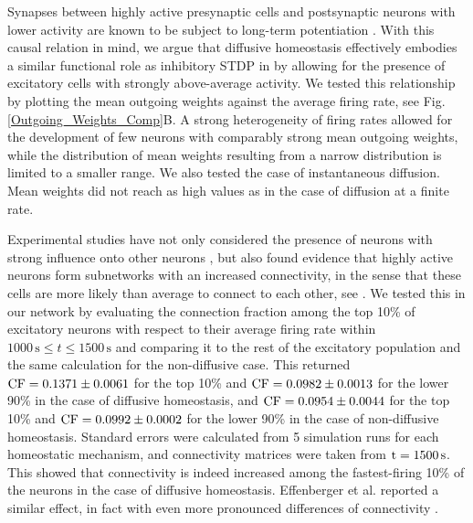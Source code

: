 \documentclass[10pt,letterpaper]{article}
\begin{document}
Synapses between highly active presynaptic cells and postsynaptic neurons with lower activity are known to be subject to long-term potentiation \cite{Sjoestroem_Syn_Plasticity_2001,Feldman_STDP_2012}. With this causal relation in mind, we argue that diffusive homeostasis effectively embodies a similar functional role as inhibitory STDP in \cite{Effenberger_2015} by allowing for the presence of excitatory cells with strongly above-average activity. We tested this relationship by plotting the mean outgoing weights against the average firing rate, see Fig. \ref{Outgoing_Weights_Comp}B. A strong heterogeneity of firing rates allowed for the development of few neurons with comparably strong mean outgoing weights, while the distribution of mean weights resulting from a narrow distribution is limited to a smaller range. We also tested the case of instantaneous diffusion. Mean weights did not reach as high values as in the case of diffusion at a finite rate.

Experimental studies have not only considered the presence of neurons with strong influence onto other neurons \cite{Eckmann_Leader_Neurons_2008}, but also found evidence that highly active neurons form subnetworks with an increased connectivity, in the sense that these cells are more likely than average to connect to each other, see \cite{Yassin_Subnetworks_2010}. We tested this in our network by evaluating the connection fraction among the top 10\% of excitatory neurons with respect to their average firing rate within $\mathrm{1000\,s} \leq t \leq \mathrm{1500\,s}$ and comparing it to the rest of the excitatory population and the same calculation for the non-diffusive case. This returned $\rm CF= 0.1371 \pm 0.0061$ for the top 10\% and $\rm CF = 0.0982 \pm 0.0013$ for the lower 90\% in the case of diffusive homeostasis, and  $\rm CF = 0.0954 \pm 0.0044$ for the top 10\% and $\rm CF = 0.0992 \pm 0.0002$ for the lower 90\% in the case of non-diffusive homeostasis. Standard errors were calculated from 5 simulation runs for each homeostatic mechanism, and connectivity matrices were taken from $\rm t = 1500\,s$. This showed that connectivity is indeed increased among the fastest-firing 10\% of the neurons in the case of diffusive homeostasis. Effenberger et al. reported a similar effect, in fact with even more pronounced differences of connectivity \cite{Effenberger_2015}.
\end{document}
